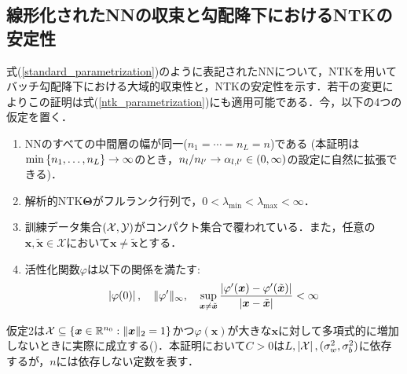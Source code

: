 \subsection{線形化されたNNの収束と勾配降下におけるNTKの安定性}
式(\ref{standard_parametrization})のように表記されたNNについて，NTKを用いてバッチ勾配降下における大域的収束性と，NTKの安定性を示す．若干の変更によりこの証明は式(\ref{ntk_parametrization})にも適用可能である．今，以下の4つの仮定を置く．
\begin{enumerate}
    \item NNのすべての中間層の幅が同一($n_1=\cdots=n_L=n$)である (本証明は$\min\left\{n_1,\ldots,n_L\right\} \rightarrow \infty$のとき，$n_l / n_{l'} \rightarrow \alpha_{l, l'} \in \left(0, \infty\right)$の設定に自然に拡張できる)．
    \item 解析的NTK$\bm{\Theta}$がフルランク行列で，$0 < \lambda_{\min} < \lambda_{\max} < \infty$．
    \item 訓練データ集合$\left(\mathcal{X}, \mathcal{Y}\right)$がコンパクト集合で覆われている．また，任意の$\bm{x}, \tilde{\bm{x}} \in \mathcal{X}$において$\bm{x} \neq \tilde{\bm{x}}$とする．
    \item 活性化関数$\varphi$は以下の関係を満たす:
    \begin{align}
        \label{act_func_lipschitz}
        \left|\varphi(0)\right|, \quad \|\varphi'\|_{\infty}, \quad \sup_{\bm{x} \neq \tilde{\bm{x}}} \dfrac{\left|\varphi'(\bm{x}) - \varphi'(\tilde{\bm{x}})\right|}{\left|\bm{x} - \tilde{\bm{x}}\right|} < \infty
    \end{align}
\end{enumerate}
仮定2は$\mathcal{X} \subseteq \left\{\bm{x} \in \mathbb{R}^{n_0}:\|\bm{x}\|_2 = 1\right\}$かつ$\varphi(\bm{x})$が大きな$\bm{x}$に対して多項式的に増加しないときに実際に成立する(\citealp{jacot2018neural})．本証明において$C>0$は$L, \left|\mathcal{X}\right|, (\sigma_w^2, \sigma_b^2)$に依存するが，$n$には依存しない定数を表す．

